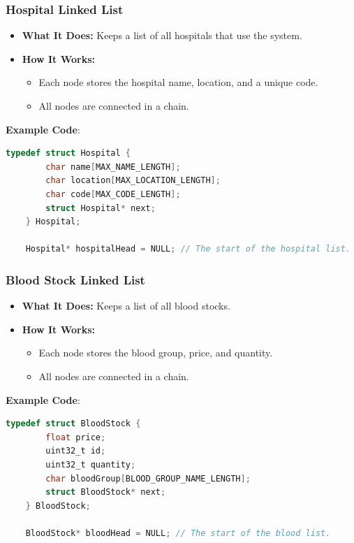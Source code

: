 \documentclass[12pt,a4paper]{report}
\begin{document}
\subsubsection{Hospital Linked List}
\begin{itemize}
    \item \normalsize \textbf{What It Does:} Keeps a list of all hospitals that use the system.
    \item \normalsize \textbf{How It Works:}
    \begin{itemize}
        \item Each node stores the hospital name, location, and a unique code.
        \item All nodes are connected in a chain.
    \end{itemize}
\end{itemize}

\normalsize \textbf{Example Code}:
\begin{lstlisting}[language=C, caption=Hospital Linked List]
    typedef struct Hospital {
        char name[MAX_NAME_LENGTH];
        char location[MAX_LOCATION_LENGTH];
        char code[MAX_CODE_LENGTH];
        struct Hospital* next;
    } Hospital;

    Hospital* hospitalHead = NULL; // The start of the hospital list.
\end{lstlisting}

\subsubsection{Blood Stock Linked List}
\begin{itemize}
    \item \normalsize \textbf{What It Does:} Keeps a list of all blood stocks.
    \item \normalsize \textbf{How It Works:}
    \begin{itemize}
        \item Each node stores the blood group, price, and quantity.
        \item All nodes are connected in a chain.
    \end{itemize}
\end{itemize}

\normalsize \textbf{Example Code}:
\begin{lstlisting}[language=C, caption=Blood Stock Linked List]
    typedef struct BloodStock {
        float price;
        uint32_t id;
        uint32_t quantity;
        char bloodGroup[BLOOD_GROUP_NAME_LENGTH];
        struct BloodStock* next;
    } BloodStock;

    BloodStock* bloodHead = NULL; // The start of the blood list.
\end{lstlisting}
\end{document}
